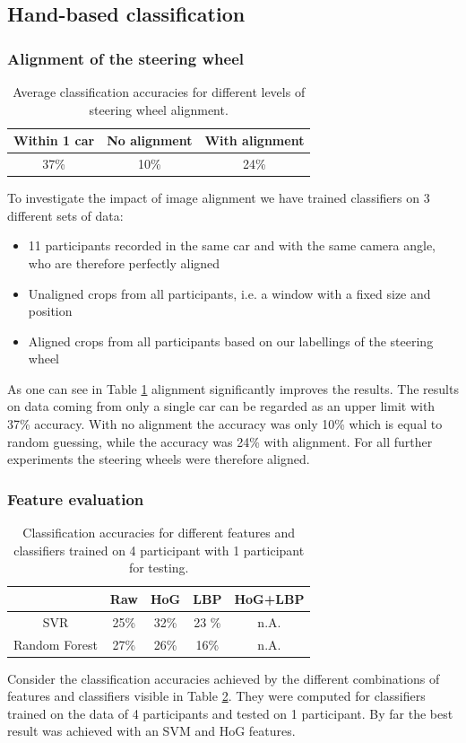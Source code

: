 \documentclass[10pt,twocolumn,letterpaper]{article}
\begin{document}
\subsection{Hand-based classification}

	\subsubsection{Alignment of the steering wheel}
	\begin{table}
		\begin{tabular}{c|c|c}
			Within 1 car & No alignment & With alignment \\ 
			\hline 
			37\% & 10\% & 24\% \\ 
		\end{tabular} 
		\caption{Average classification accuracies for different levels of steering wheel alignment.}
		\label{hand_estimation_alignment}
	\end{table}
	
	To investigate the impact of image alignment we have trained classifiers on 3 different sets of data:
	\begin{itemize}
		\item 11 participants recorded in the same car and with the same camera angle, who are therefore perfectly aligned
		\item Unaligned crops from all participants, i.e. a window with a fixed size and position
		\item Aligned crops from all participants based on our labellings of the steering wheel
	\end{itemize}
	As one can see in Table \ref{hand_estimation_alignment} alignment significantly improves the results. The results on data coming from only a single car can be regarded as an upper limit with 37\% accuracy. With no alignment the accuracy was only 10\% which is equal to random guessing, while the accuracy was 24\% with alignment. For all further experiments the steering wheels were therefore aligned.


	\subsubsection{Feature evaluation}
	\begin{table}
		\begin{tabular}{c|c|c|c|c}
			& Raw & HoG & LBP & HoG+LBP \\ 
			\hline 
			SVR & 25\% & 32\% & 23 \% & n.A. \\ 
			\hline 
			Random Forest & 27\% & 26\% & 16\% & n.A. \\ 
		\end{tabular} 
		\caption{Classification accuracies for different features and classifiers trained on 4 participant with 1 participant for testing.}
		\label{hand_estimation_features}
	\end{table}
	Consider the classification accuracies achieved by the different combinations of features and classifiers visible in Table \ref{hand_estimation_features}. They were computed for classifiers trained on the data of 4 participants and tested on 1 participant. By far the best result was achieved with an SVM and HoG features.
	
\end{document}
